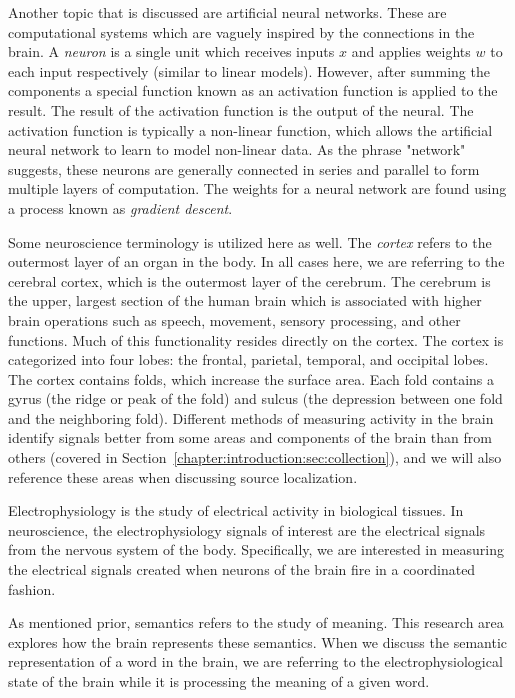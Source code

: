 Another topic that is discussed are artificial neural networks. These are 
computational systems which are vaguely inspired by the connections in the 
brain. A \emph{neuron} is a single unit which receives inputs $x$ and applies 
weights $w$ to each input respectively (similar to linear models). However, 
after summing the components a special function known as an activation function 
is applied to the result. The result of the activation function is the output 
of the neural. The activation function is typically a non-linear function, 
which allows the artificial neural network to learn to model non-linear data.  
As the phrase "network" suggests, these neurons are generally connected in 
series and parallel to form multiple layers of computation. The weights for a 
neural network are found using a process known as \emph{gradient descent}. 

Some neuroscience terminology is utilized here as well. The \emph{cortex} 
refers to the outermost layer of an organ in the body. In all cases here, we 
are referring to the cerebral cortex, which is the outermost layer of the 
cerebrum. The cerebrum is the upper, largest section of the human brain which 
is associated with higher brain operations such as speech, movement, sensory 
processing, and other functions. Much of this functionality resides directly on 
the cortex. The cortex is categorized into four lobes: the frontal, parietal, 
temporal, and occipital lobes. The cortex contains folds, which increase the 
surface area. Each fold contains a gyrus (the ridge or peak of the fold) and 
sulcus (the depression between one fold and the neighboring fold). Different 
methods of measuring activity in the brain identify signals better from some 
areas and components of the brain than from others (covered in 
Section~\ref{chapter:introduction:sec:collection}), and we will also reference 
these areas when discussing source localization.

Electrophysiology is the study of electrical activity in biological tissues. In 
neuroscience, the electrophysiology signals of interest are the electrical 
signals from the nervous system of the body. Specifically, we are interested in 
measuring the electrical signals created when neurons of the brain fire in a 
coordinated fashion.

As mentioned prior, semantics refers to the study of meaning. This research 
area explores how the brain represents these semantics. When we discuss the 
semantic representation of a word in the brain, we are referring to the 
electrophysiological state of the brain while it is processing the meaning of a 
given word.
